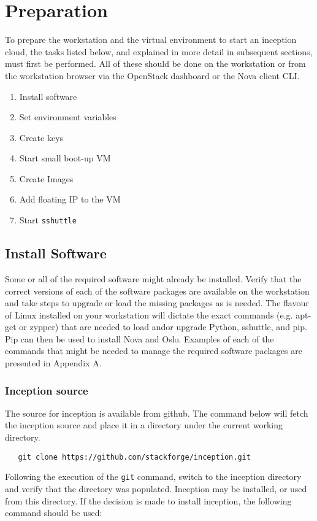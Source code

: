\section{Preparation}
To prepare the workstation and the virtual environment to start an inception cloud, the tasks listed below, and
explained in more detail in subsequent sections,  must first be performed.
All of these should be done on the workstation or from the workstation browser via the OpenStack dashboard or the
Nova client CLI.

\begin{enumerate}
\item Install software
\item Set environment variables
\item Create keys
\item Start small boot-up VM
\item Create Images
\item Add floating IP to the VM
\item Start \verb!sshuttle!
\end{enumerate}

\subsection{Install Software}
Some or all of the required software might already be installed.
Verify that the correct versions of each of the software packages are available on the workstation
and take steps to upgrade or load the missing packages as is needed.
The flavour of Linux installed on your workstation will dictate the exact commands (e.g. apt-get or zypper)
that are needed to load and\/or upgrade Python, sshuttle, and pip.
Pip can then be used to install Nova and Oslo.
Examples of each of the commands that might be needed to manage the required software packages are presented
in Appendix A.

\subsubsection{Inception source}
The source for inception is available from github.
The command below will fetch the inception source and place it in a directory under the current working directory.

\small\begin{verbatim}
   git clone https://github.com/stackforge/inception.git
\end{verbatim}\normalsize

Following the execution of the \verb!git! command, switch to the inception directory and verify that the
directory was populated.
Inception may be installed, or used from this directory.
If the decision is made to install inception, the following command should be used:

